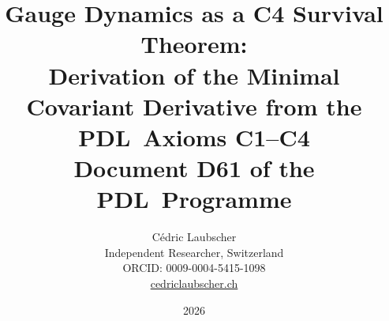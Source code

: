 \documentclass[11pt,a4paper]{article}
\theoremstyle{plain}
\theoremstyle{definition}
\theoremstyle{remark}
\newcommand{\PDL}{\textsc{PDL}}
\begin{document}

\title{\textbf{Gauge Dynamics as a C4 Survival Theorem:\\
Derivation of the Minimal Covariant Derivative from the\\
\PDL\ Axioms C1--C4}\\[0.5em]
\large Document D61 of the \PDL\ Programme}

\author{C\'edric Laubscher\\
\small Independent Researcher, Switzerland\\
\small ORCID: 0009-0004-5415-1098\\
\small \href{https://cedriclaubscher.ch}{cedriclaubscher.ch}}

\date{2026}

\maketitle
\end{document}
